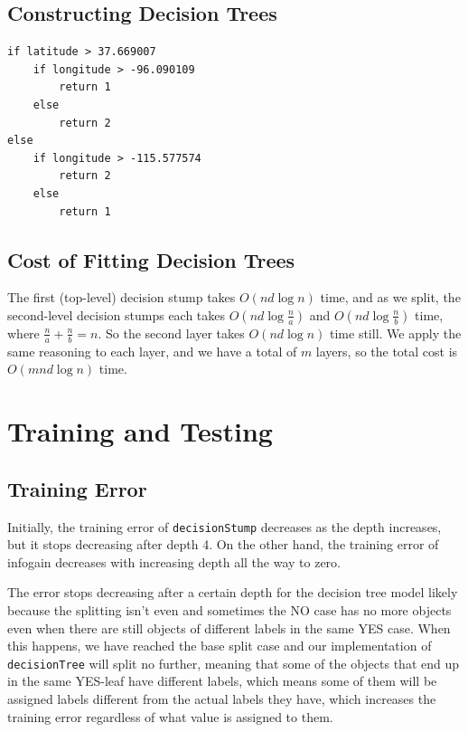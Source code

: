 \documentclass{article}
\begin{document}
\subsection{Constructing Decision Trees}
\begin{verbatim}
if latitude > 37.669007
    if longitude > -96.090109
        return 1
    else
        return 2
else
    if longitude > -115.577574
        return 2
    else
        return 1
\end{verbatim}



\subsection{Cost of Fitting Decision Trees}

The first (top-level) decision stump takes $O(nd\log{n})$ time, and as we split, the second-level decision stumps each takes $O(nd\log{\frac{n}{a}})$ and $O(nd\log{\frac{n}{b}})$ time, where $\frac{n}{a} + \frac{n}{b} = n$. So the second layer takes $O(nd\log{n})$ time still. We apply the same reasoning to each layer, and we have a total of $m$ layers, so the total cost is $O(mnd\log{n})$ time.

\section{Training and Testing}

\subsection{Training Error}

Initially, the training error of \texttt{decisionStump} decreases as the depth increases, but it stops decreasing after depth 4. On the other hand, the training error of infogain decreases with increasing depth all the way to zero.

The error stops decreasing after a certain depth for the decision tree model likely because the splitting isn't even and sometimes the NO case has no more objects even when there are still objects of different labels in the same YES case. When this happens, we have reached the base split case and our implementation of \texttt{decisionTree} will split no further, meaning that some of the objects that end up in the same YES-leaf have different labels, which means some of them will be assigned labels different from the actual labels they have, which increases the training error regardless of what value is assigned to them.
\end{document}
